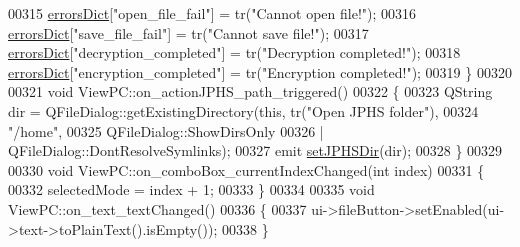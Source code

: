 \begin{DoxyCode}
00315     \hyperlink{class_view_p_c_aaf7f058e5589d65fec72a21abfd5629b}{errorsDict}[\textcolor{stringliteral}{"open\_file\_fail"}] = tr(\textcolor{stringliteral}{"Cannot open file!"});
00316     \hyperlink{class_view_p_c_aaf7f058e5589d65fec72a21abfd5629b}{errorsDict}[\textcolor{stringliteral}{"save\_file\_fail"}] = tr(\textcolor{stringliteral}{"Cannot save file!"});
00317     \hyperlink{class_view_p_c_aaf7f058e5589d65fec72a21abfd5629b}{errorsDict}[\textcolor{stringliteral}{"decryption\_completed"}] = tr(\textcolor{stringliteral}{"Decryption completed!"});
00318     \hyperlink{class_view_p_c_aaf7f058e5589d65fec72a21abfd5629b}{errorsDict}[\textcolor{stringliteral}{"encryption\_completed"}] = tr(\textcolor{stringliteral}{"Encryption completed!"});
00319 \}
00320 
00321 \textcolor{keywordtype}{void} ViewPC::on\_actionJPHS\_path\_triggered()
00322 \{
00323     QString dir = QFileDialog::getExistingDirectory(\textcolor{keyword}{this}, tr(\textcolor{stringliteral}{"Open JPHS folder"}),
00324                                                     \textcolor{stringliteral}{"/home"},
00325                                                     QFileDialog::ShowDirsOnly
00326                                                     | QFileDialog::DontResolveSymlinks);
00327     emit \hyperlink{class_view_p_c_ae81085836c0c01bc9556a5b27eb8d19c}{setJPHSDir}(dir);
00328 \}
00329 
00330 \textcolor{keywordtype}{void} ViewPC::on\_comboBox\_currentIndexChanged(\textcolor{keywordtype}{int} index)
00331 \{
00332     selectedMode = index + 1;
00333 \}
00334 
00335 \textcolor{keywordtype}{void} ViewPC::on\_text\_textChanged()
00336 \{
00337     ui->fileButton->setEnabled(ui->text->toPlainText().isEmpty());
00338 \}
\end{DoxyCode}
